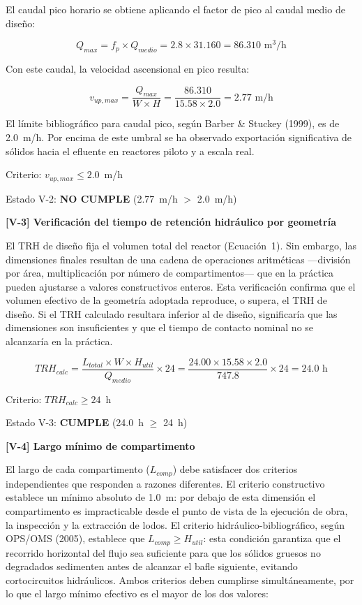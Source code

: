 \documentclass[12pt,a4paper]{article}
\begin{document}
El caudal pico horario se obtiene aplicando el factor de pico al caudal medio de diseño:

\begin{equation}
Q_{max} = f_p \times Q_{medio} = 2.8 \times 31.160 = 86.310 \text{ m}^3\text{/h}
\end{equation}

Con este caudal, la velocidad ascensional en pico resulta:

\begin{equation}
v_{up,max} = \frac{Q_{max}}{W \times H} = \frac{86.310}{15.58 \times 2.0} = 2.77 \text{ m/h}
\end{equation}

El límite bibliográfico para caudal pico, según Barber \& Stuckey (1999), es de 2.0~m/h. Por encima de este umbral se ha observado exportación significativa de sólidos hacia el efluente en reactores piloto y a escala real.

Criterio: $v_{up,max} \leq 2.0$~m/h

Estado V-2: \textbf{NO CUMPLE} (2.77~m/h $>$ 2.0~m/h)

\textbf{[V-3] Verificación del tiempo de retención hidráulico por geometría}

El TRH de diseño fija el volumen total del reactor (Ecuación~1). Sin embargo, las dimensiones finales resultan de una cadena de operaciones aritméticas ---división por área, multiplicación por número de compartimentos--- que en la práctica pueden ajustarse a valores constructivos enteros. Esta verificación confirma que el volumen efectivo de la geometría adoptada reproduce, o supera, el TRH de diseño. Si el TRH calculado resultara inferior al de diseño, significaría que las dimensiones son insuficientes y que el tiempo de contacto nominal no se alcanzaría en la práctica.

\begin{equation}
TRH_{calc} = \frac{L_{total} \times W \times H_{util}}{Q_{medio}} \times 24 = \frac{24.00 \times 15.58 \times 2.0}{747.8} \times 24 = 24.0 \text{ h}
\end{equation}

Criterio: $TRH_{calc} \geq 24$~h

Estado V-3: \textbf{CUMPLE} (24.0~h $\geq$ 24~h)

\textbf{[V-4] Largo mínimo de compartimento}

El largo de cada compartimento ($L_{comp}$) debe satisfacer dos criterios independientes que responden a razones diferentes. El criterio constructivo establece un mínimo absoluto de 1.0~m: por debajo de esta dimensión el compartimento es impracticable desde el punto de vista de la ejecución de obra, la inspección y la extracción de lodos. El criterio hidráulico-bibliográfico, según OPS/OMS (2005), establece que $L_{comp} \geq H_{util}$: esta condición garantiza que el recorrido horizontal del flujo sea suficiente para que los sólidos gruesos no degradados sedimenten antes de alcanzar el bafle siguiente, evitando cortocircuitos hidráulicos. Ambos criterios deben cumplirse simultáneamente, por lo que el largo mínimo efectivo es el mayor de los dos valores:
\end{document}
